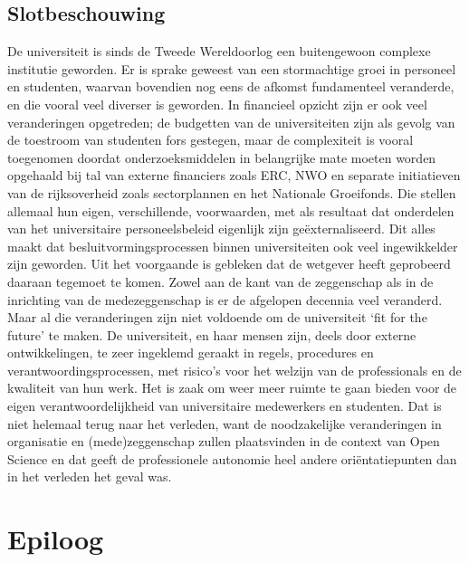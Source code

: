 \documentclass[empirical, authordate, ]{new-jote-article}
\begin{document}
	\section{Slotbeschouwing}



	De universiteit is sinds de Tweede Wereldoorlog een buitengewoon complexe institutie geworden. Er is sprake geweest van een stormachtige groei in personeel en studenten, waarvan bovendien nog eens de afkomst fundamenteel veranderde, en die vooral veel diverser is geworden. In financieel opzicht zijn er ook veel veranderingen opgetreden; de budgetten van de universiteiten zijn als gevolg van de toestroom van studenten fors gestegen, maar de complexiteit is vooral toegenomen doordat onderzoeksmiddelen in belangrijke mate moeten worden opgehaald bij tal van externe financiers zoals ERC, NWO en separate initiatieven van de rijksoverheid zoals sectorplannen en het Nationale Groeifonds. Die stellen allemaal hun eigen, verschillende, voorwaarden, met als resultaat dat onderdelen van het universitaire personeelsbeleid eigenlijk zijn geëxternaliseerd. Dit alles maakt dat besluitvormingsprocessen binnen universiteiten ook veel ingewikkelder zijn geworden. Uit het voorgaande is gebleken dat de wetgever heeft geprobeerd daaraan tegemoet te komen. Zowel aan de kant van de zeggenschap als in de inrichting van de medezeggenschap is er de afgelopen decennia veel veranderd. Maar al die veranderingen zijn niet voldoende om de universiteit ‘fit for the future' te maken. De universiteit, en haar mensen zijn, deels door externe ontwikkelingen, te zeer ingeklemd geraakt in regels, procedures en verantwoordingsprocessen, met risico's voor het welzijn van de professionals en de kwaliteit van hun werk. Het is zaak om weer meer ruimte te gaan bieden voor de eigen verantwoordelijkheid van universitaire medewerkers en studenten. Dat is niet helemaal terug naar het verleden, want de noodzakelijke veranderingen in organisatie en (mede)zeggenschap zullen plaatsvinden in de context van Open Science en dat geeft de professionele autonomie heel andere oriëntatiepunten dan in het verleden het geval was.







	\chapter{Epiloog}
\end{document}
